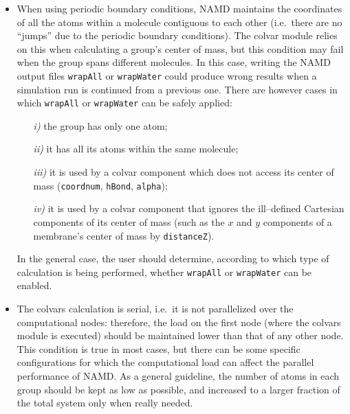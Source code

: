 \begin{itemize}

\item When using periodic boundary conditions, NAMD maintains the
  coordinates of all the atoms within a molecule contiguous to each
  other (i.e.~there are no ``jumps'' due to the periodic boundary
  conditions).  The colvar module relies on this when calculating a
  group's center of mass, but this condition may fail when the group
  spans different molecules.  In this case, writing the NAMD output
  files \texttt{wrapAll} or \texttt{wrapWater} could produce wrong
  results when a simulation run is continued from a previous one.
  There are however cases in which \texttt{wrapAll} or
  \texttt{wrapWater} can be safely applied:
  \begin{enumerate}
  \item[\emph{i)}] the group has only one atom;
  \item[\emph{ii)}] it has all its atoms within the same molecule;
  \item[\emph{iii)}] it is used by a colvar component which does
    not access its center of mass (\texttt{coordnum},
    \texttt{hBond}, \texttt{alpha});
  \item[\emph{iv)}] it is used by a colvar component that ignores the
    ill--defined Cartesian components of its center of mass (such as
    the $x$ and $y$ components of a membrane's center of mass by
    \texttt{distanceZ}).
  \end{enumerate}    
  In the general case, the user should determine, according to which
  type of calculation is being performed, whether \texttt{wrapAll} or
  \texttt{wrapWater} can be enabled.

\item The colvars calculation is serial, i.e.~it is not parallelized
  over the computational nodes: therefore, the load on the first node
  (where the colvars module is executed) should be maintained lower
  than that of any other node.  This condition is true in most cases,
  but there can be some specific configurations for which the
  computational load can affect the parallel performance of NAMD.  As
  a general guideline, the number of atoms in each group should be
  kept as low as possible, and increased to a larger fraction of the
  total system only when really needed.


\end{itemize}



